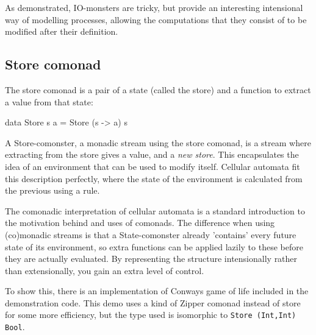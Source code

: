 As demonstrated, IO-monsters are tricky, but provide an interesting intensional way of modelling processes, allowing the computations that they consist of to be modified after their definition.
 
\subsection{Store comonad}

The store comonad is a pair of a state (called the store) and a function to extract a value from that state:

\begin{haskell}
data Store s a = Store (s -> a) s
\end{haskell}

A Store-comonster, a monadic stream using the store comonad, is a stream where extracting from the store gives a value, and a \emph{new store}. This encapsulates the idea of an environment that can be used to modify itself. Cellular automata fit this description perfectly, where the state of the environment is calculated from the previous using a rule. 

The comonadic interpretation of cellular automata is a standard introduction to the motivation behind and uses of comonads. The difference when using (co)monadic streams is that a State-comonster already 'contains' every future state of its environment, so extra functions can be applied lazily to these before they are actually evaluated. By representing the structure intensionally rather than extensionally, you gain an extra level of control.

To show this, there is an implementation of Conways game of life included in the demonstration code. This demo uses a kind of Zipper comonad instead of store for some more efficiency, but the type used is isomorphic to \verb+Store (Int,Int) Bool+.
